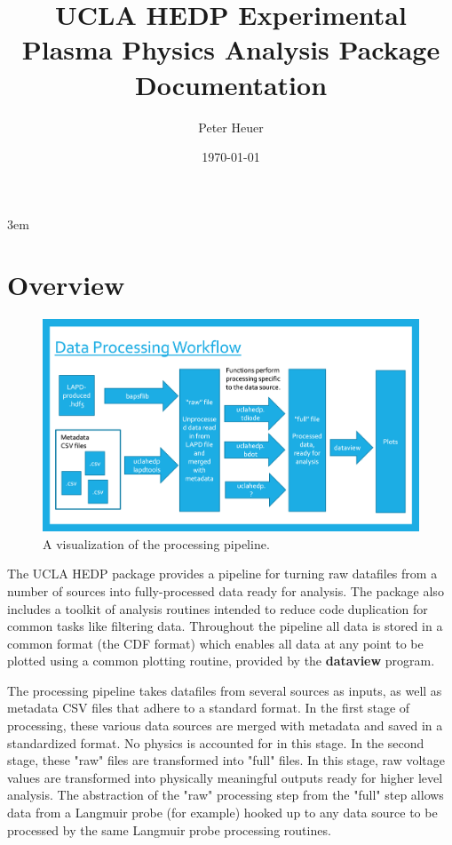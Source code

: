 \documentclass[12pt]{article}
\title{UCLA HEDP Experimental Plasma Physics Analysis Package Documentation}
\date{\today}
\author{Peter Heuer}
\newcommand{\loc}[1]{
{\bf \fontfamily{pcr}\selectfont #1}
}
\begin{document}
\emergencystretch 3em

\maketitle

\newpage

\tableofcontents

\newpage

\section{Overview}

\begin{figure}[h]
\centering
\includegraphics[width=\textwidth]{process_flow}
\caption[Processing Workflow]
{\label{process_flow} A visualization of the processing pipeline.}
\end{figure}

The UCLA HEDP package provides a pipeline for turning  raw datafiles from a number of sources into fully-processed data ready for analysis. The package also includes a toolkit of analysis routines intended to reduce code duplication for common tasks like filtering data. Throughout the pipeline all data is stored in a common format (the CDF format) which enables all data at any point to be plotted using a common plotting routine, provided by the \loc{dataview} program.

The processing pipeline takes datafiles from several sources as inputs, as well as metadata CSV files that adhere to a standard format. In the first stage of processing, these various data sources are merged with metadata and saved in a standardized format. No physics is accounted for in this stage. In the second stage, these "raw" files are transformed into "full" files. In this stage, raw voltage values are transformed into physically meaningful outputs ready for higher level analysis. The abstraction of the "raw" processing step from the "full" step allows data from a Langmuir probe (for example) hooked up to any data source to be processed by the same Langmuir probe processing routines.
\end{document}
